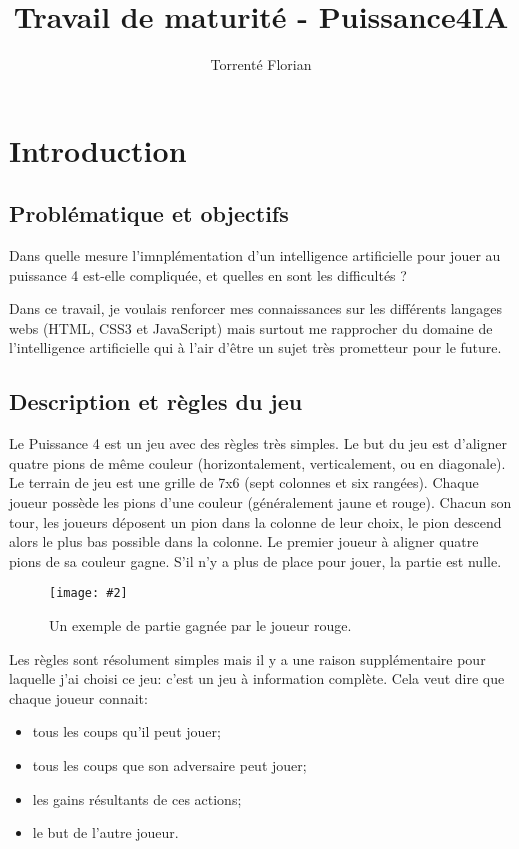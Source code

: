 \documentclass[a4paper]{article}
\author{Torrenté Florian}
\title{Travail de maturité - Puissance4IA}
\newcommand{\img}[3][]{
    \begin{figure}[H]
        \centering
        \texttt{[image: \#2]}
        \caption{#1}    
    \end{figure}
}
\begin{document}
\maketitle

\tableofcontents

\newpage
\section{Introduction}

\subsection{Problématique et objectifs}
    Dans quelle mesure l'imnplémentation d'un intelligence artificielle pour jouer au puissance 4 est-elle compliquée, et quelles en sont les difficultés ?

    Dans ce travail, je voulais renforcer mes connaissances sur les différents langages webs (HTML, CSS3 et JavaScript) mais surtout me rapprocher du domaine de l'intelligence artificielle qui à l'air d'être un sujet très prometteur pour le future.

\subsection{Description et règles du jeu}
    Le Puissance 4 est un jeu avec des règles très simples. Le but du jeu est d'aligner quatre pions de même couleur (horizontalement, verticalement, ou en diagonale). Le terrain de jeu est une grille de 7x6 (sept colonnes et six rangées). Chaque joueur possède les pions d'une couleur (généralement jaune et rouge). Chacun son tour, les joueurs déposent un pion dans la colonne de leur choix, le pion descend alors le plus bas possible dans la colonne. Le premier joueur à aligner quatre pions de sa couleur gagne. S'il n'y a plus de place pour jouer, la partie est nulle.


    \img[Un exemple de partie gagnée par le joueur rouge.]{Images/puissance4.jpg}{0.5}

    Les règles sont résolument simples mais il y a une raison supplémentaire pour laquelle j'ai choisi ce jeu: c'est un jeu à information complète. Cela veut dire que chaque joueur connait: \begin{itemize}
        \item tous les coups qu'il peut jouer;
        \item tous les coups que son adversaire peut jouer;
        \item les gains résultants de ces actions;
        \item le but de l'autre joueur.
    \end{itemize}
\end{document}
